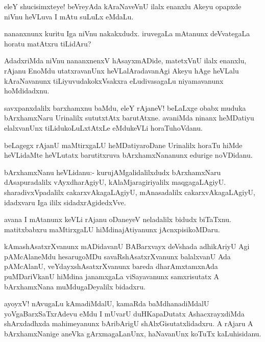 \documentclass{article}
\begin{document}
\begin{mn}
eleY shucisimxteye! beVreyAda kAraNaveVnU ilalx enanxlu Akeyu opapxde
niVnu heVLuva I mAtu suLuLx eMdaLu.
\end{mn}

\begin{mn}
nananxnunx kuritu Iga niVnu nakakxdudx. iruvegaLa mAtanunx deVvategaLa
horatu matAtxru tiLidAru?
\end{mn}

\begin{mn}
AdadxriMda niVnu nananxnenxV hAsayxmADide, matetxVnU ilalx enanxlu,
rAjanu EnoMdu utatxravanUnx heVLalAradavanAgi Akeyu hAge heVLalu
kAraNavanunx tiLiyuvudakokxVsakxra eLudivasagaLu niyamavanunx hoMdidadxnu.
\end{mn}

\begin{mn}%
savxpanxdalilx barxhamxnu baMdu, eleY rAjaneV! beLaLxge obabx muduka
bArxhamxNaru Urinalilx sututxtAtx barutAtxne. avaniMda ninanx
heMDatiyu elalxvanUnx tiLidukoLuLxtAtxLe eMdukeVLi horaTuhoVdanu.
\end{mn}

\begin{mn}
beLagegx rAjanU maMtirxgaLU heMDatiyaroDane Urinalilx horaTu hiMde
heVLidaMte heVLutatx barutitxruva bArxhamxNananunx edurige noVDidanu.
\end{mn}

\begin{mn}
bArxhamxNanu heVLidanu:- kurujAMgalidalilxdudx bArxhamxNaru
dAsapuradalilx vAyxdharAgiyU, kAlaMjaragiriyalilx
maqgagaLAgiyU. sharadivxVpadalilx cakarxvAkagaLAgiyU, mAnasadalilx
cakarxvAkagaLAgiyU, idadxvaru Iga ililx sidadxrAgidedxVve.
\end{mn}

\begin{mn}%
avana I mAtanunx keVLi rAjanu oDaneyeV neladalilx bidudx
biTaTxnu. matitxbabxru maMtirxgaLU hiMdinajAtiyanunx jAcnxpisikoMDaru.
\end{mn}

\begin{mn}%
kAmashAsatxrXvanunx mADidavanU BABarxvayx deVshada adhikAriyU Agi
pAMcAlaneMdu hesarugoMDu savaRshAsatxrXvanunx balalxvanU Ada
pAMcAlanU, veYdayxshAsatxrXvanunx bareda dharAmxtamxnAda puMDariVkanU
hiMdina janamxgaLa viSayavanunx samxrisutatx A bArxhamxNana
muMdugaDeyalilx bidadxru.
\end{mn}

\begin{mn}%
ayoyxV! nAvugaLu kAmadiMdalU, kamaRda baMdhanadiMdalU
yoVgaBarxSaTxrAdevu eMdu I mUvarU duHKapaDutatx AshacxrayxdiMda
shArxdadhxda mahimeyanunx bAribArigU shAlxGisutatxlidadxru. A rAjaru A
bArxhamxNanige aneVka gArxmagaLanUnx, haNavanUnx koTuTx kaLuhisidanu.
\end{mn}
\end{document}
